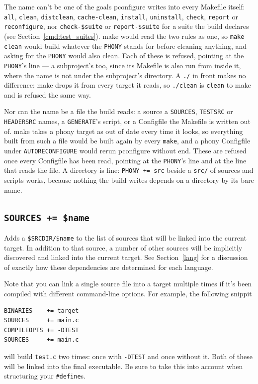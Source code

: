\documentclass{article}
\begin{document}
The name can't be one of the goals pconfigure writes into every
Makefile itself: \texttt{all}, \texttt{clean}, \texttt{distclean},
\texttt{cache-clean}, \texttt{install}, \texttt{uninstall},
\texttt{check}, \texttt{report} or \texttt{reconfigure}, nor
\texttt{check-\$suite} or \texttt{report-\$suite} for a suite the
build declares (see Section~\ref{cmd:test_suites}).  make would read
the two rules as one, so \texttt{make clean} would build whatever the
\texttt{PHONY} stands for before cleaning anything, and asking for the
\texttt{PHONY} would also clean.  Each of these is refused, pointing
at the \texttt{PHONY}'s line --- a subproject's too, since its
Makefile is also run from inside it, where the name is not under the
subproject's directory.  A \texttt{./} in front makes no difference:
make drops it from every target it reads, so \texttt{./clean} is
\texttt{clean} to make and is refused the same way.

Nor can the name be a file the build reads: a source a
\texttt{SOURCES}, \texttt{TESTSRC} or \texttt{HEADERSRC} names, a
\texttt{GENERATE}'s script, or a Configfile the Makefile is written
out of.  make takes a phony target as out of date every time it looks,
so everything built from such a file would be built again by every
\texttt{make}, and a phony Configfile under \texttt{AUTORECONFIGURE}
would rerun pconfigure without end.  These are refused once every
Configfile has been read, pointing at the \texttt{PHONY}'s line and at
the line that reads the file.  A directory is fine: \texttt{PHONY +=
src} beside a \texttt{src/} of sources and scripts works, because
nothing the build writes depends on a directory by its bare name.

\subsection{\texttt{SOURCES += \$name} \label{cmd:sources}}

Adds a \texttt{\$SRCDIR/\$name} to the list of sources that will be
linked into the current target.  In addition to that source, a number
of other sources will be implicitly discovered and linked into the
current target.  See Section~\ref{lang} for a discussion of exactly
how these dependencies are determined for each language.

Note that you can link a single source file into a target multiple
times if it's been compiled with different command-line options.  For
example, the following snippit
\begin{verbatim}
BINARIES    += target
SOURCES     += main.c
COMPILEOPTS += -DTEST
SOURCES     += main.c
\end{verbatim}
will build \texttt{test.c} two times: once with \texttt{-DTEST} and
once without it.  Both of these will be linked into the final
executable.  Be sure to take this into account when structuring your
\texttt{\#define}s.
\end{document}
